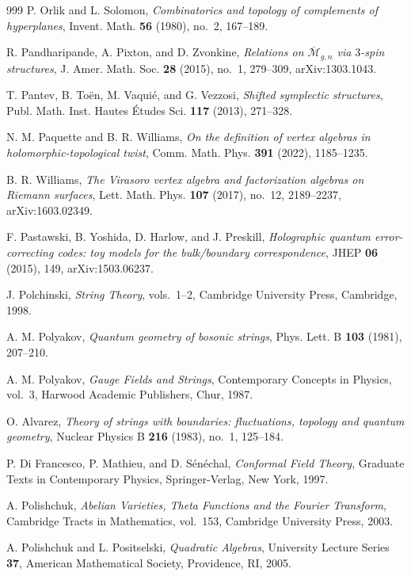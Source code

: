 \begin{thebibliography}{999}
P. Orlik and L. Solomon, \emph{Combinatorics and topology of complements of hyperplanes}, Invent. Math. \textbf{56} (1980), no.~2, 167--189.

R. Pandharipande, A. Pixton, and D. Zvonkine, \emph{Relations on $\overline{\mathcal{M}}_{g,n}$ via $3$-spin structures}, J. Amer. Math. Soc. \textbf{28} (2015), no.~1, 279--309, arXiv:1303.1043.

T. Pantev, B. To\"en, M. Vaqui\'e, and G. Vezzosi, \emph{Shifted symplectic structures}, Publ. Math. Inst. Hautes \'Etudes Sci. \textbf{117} (2013), 271--328.

N. M. Paquette and B. R. Williams, \emph{On the definition of vertex algebras in holomorphic-topological twist}, Comm. Math. Phys. \textbf{391} (2022), 1185--1235.

B. R. Williams, \emph{The Virasoro vertex algebra and factorization algebras on Riemann surfaces}, Lett. Math. Phys. \textbf{107} (2017), no.~12, 2189--2237, arXiv:1603.02349.

F. Pastawski, B. Yoshida, D. Harlow, and J. Preskill, \emph{Holographic quantum error-correcting codes: toy models for the bulk/boundary correspondence}, JHEP \textbf{06} (2015), 149, arXiv:1503.06237.

J. Polchinski, \emph{String Theory}, vols.~1--2, Cambridge University Press, Cambridge, 1998.

A. M. Polyakov, \emph{Quantum geometry of bosonic strings}, Phys. Lett. B \textbf{103} (1981), 207--210.

A. M. Polyakov, \emph{Gauge Fields and Strings}, Contemporary Concepts in Physics, vol.~3, Harwood Academic Publishers, Chur, 1987.

O. Alvarez, \emph{Theory of strings with boundaries: fluctuations, topology and quantum geometry}, Nuclear Physics B \textbf{216} (1983), no.~1, 125--184.

P. Di Francesco, P. Mathieu, and D. S\'en\'echal, \emph{Conformal Field Theory}, Graduate Texts in Contemporary Physics, Springer-Verlag, New York, 1997.

A. Polishchuk, \emph{Abelian Varieties, Theta Functions and the Fourier Transform}, Cambridge Tracts in Mathematics, vol.~153, Cambridge University Press, 2003.

A. Polishchuk and L. Positselski, \emph{Quadratic Algebras}, University Lecture Series \textbf{37}, American Mathematical Society, Providence, RI, 2005.


\end{thebibliography}
